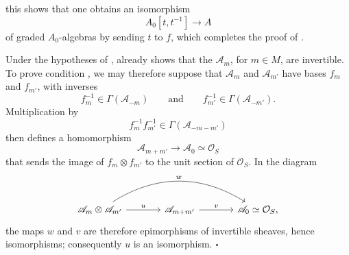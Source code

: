 this shows that one obtains an isomorphism
\[
  A_0[t,t^{-1}]\longrightarrow A
\]
of graded \(A_0\)-algebras by sending \(t\) to \(f\), which completes
the proof of .

Under the hypotheses of
,
 already shows that the
\(\mathscr A_m\), for \(m\in M\), are invertible. To prove condition
, we may
therefore suppose that \(\mathscr A_m\) and \(\mathscr A_{m'}\) have
bases \(f_m\) and \(f_{m'}\), with inverses
\[
  f_m^{-1}\in\Gamma(\mathscr A_{-m})
  \qquad\text{and}\qquad
  f_{m'}^{-1}\in\Gamma(\mathscr A_{-m'}).
\]
Multiplication by
\[
  f_m^{-1}f_{m'}^{-1}
  \in\Gamma(\mathscr A_{-m-m'})
\]
then defines a homomorphism
\[
  \mathscr A_{m+m'}\longrightarrow
  \mathscr A_0\simeq\mathcal O_S
\]
that sends the image of \(f_m\otimes f_{m'}\) to the unit section of
\(\mathcal O_S\). In the diagram
\[
\begin{tikzcd}[column sep=large]
  \mathscr A_m\otimes\mathscr A_{m'}
    \arrow[r,"u"]
    \arrow[rr,bend left=32,"w"]
  & \mathscr A_{m+m'}
    \arrow[r,"v"]
  & \mathscr A_0\simeq\mathcal O_S ,
\end{tikzcd}
\]
the maps \(w\) and \(v\) are therefore epimorphisms of invertible
sheaves, hence isomorphisms; consequently \(u\) is an isomorphism.
\hfill\(\square\)
